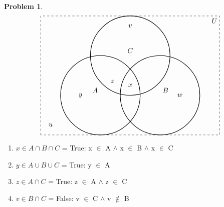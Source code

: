 \documentclass{article}
\theoremstyle{definition}
\newtheorem{problem}{Problem}[section]
\begin{document}
\begin{problem}
\[

\begin{tikzpicture}[scale=1.0]

  \draw[dashed] (-3,-2) rectangle (6,4);
  \node[anchor=north east] at (6,4) {$U$};

  \draw[thick] (0,0) circle (2) node[above left] {$A$};
  \draw[thick] (3,0) circle (2) node[above right] {$B$};
  \draw[thick] (1.5,2) circle (2) node[above] {$C$};

  \node at (-1,0) {$y$};       %
  \node at (4,0) {$w$};        %
  \node at (1.5,3.5) {$v$};     %
  \node at (1.5,0.5) {$x$};     %
  \node at (0.6,0.7) {$z$};       %
  \node at (-2.5,-1.5) {$u$};   %

\end{tikzpicture}
\]
    \begin{enumerate}[label=(\alph*)]
        Compute

        \item \(x \in A \cap B \cap C\) = True: x $\in$ A $\land$ x $\in$ B $\land$ x $\in$ C
        \item \(y \in A \cup B \cup C\) = True: y $\in$ A
        \item \(z \in A \cap C\) = True: z $\in$ A $\land$ z $\in$ C
        \item \(v \in B \cap C\) = False: v $\in$ C $\land$ v $\notin$ B

    \end{enumerate}
\end{problem}
\end{document}
